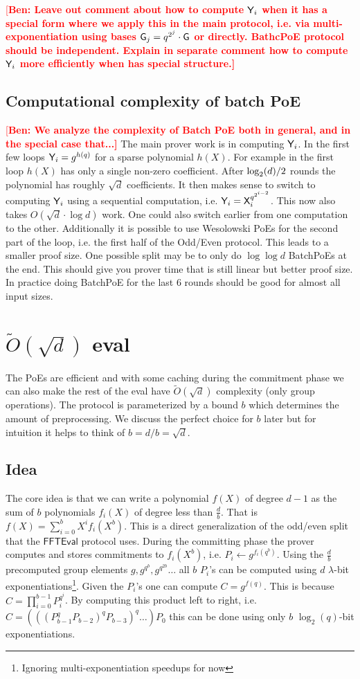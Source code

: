 \documentclass[12pt]{article}
\theoremstyle{Definition}
\newcommand{\ben}[1]{{\textcolor{red}{[\bf Ben: #1]}}}
\newcommand{\ben}[1]{}
\begin{document}
\ben{Leave out comment about how to compute $\mathsf{Y}_i$ when it has a special form where we apply this in the main protocol, i.e. via multi-exponentiation using bases $\mathsf{G}_j=q^{ 2^{j}} \cdot \mathsf{G}$ or directly. BathcPoE protocol should be independent. Explain in separate comment how to compute $\mathsf{Y}_i$ more efficiently when has special structure.}

\subsection{Computational complexity of batch PoE}
\ben{We analyze the complexity of Batch PoE both in general, and in the special case that...} The main prover work is in computing $\mathsf{Y}_i$. In the first few loops $\mathsf{Y}_i=g^{h(q)}$ for a sparse polynomial $h(X)$. For example in the first loop $h(X)$ has only a single non-zero coefficient.
After $\log_2(d)/2$ rounds the polynomial has roughly $\sqrt{d}$ coefficients. It then makes sense to switch to computing $\mathsf{Y}_i$ using a sequential computation, i.e. $\mathsf{Y}_i=\mathsf{X}_i^{q^{2^{i-2}}}$. This now also takes $O(\sqrt{d}\cdot \log{d})$ work. One could also switch earlier from one computation to the other. Additionally it is possible to use Wesolowski PoEs for the second part of the loop, i.e. the first half of the Odd/Even protocol. This leads to a smaller proof size. One possible split may be to only do $\log{\log{d}}$ BatchPoEs at the end. This should give you prover time that is still linear but better proof size. In practice doing BatchPoE for the last $6$ rounds should be good for almost all input sizes.
\section{$\tilde{O}(\sqrt{d})$ eval}
The PoEs are efficient and with some caching during the commitment phase we can also make the rest of the eval have $\tilde{O}(\sqrt{d})$ complexity (only group operations). The protocol is parameterized by a bound $b$ which determines the amount of preprocessing. We discuss the perfect choice for $b$ later but for intuition it helps to think of $b=d/b=\sqrt{d}$.
\subsection{Idea}
The core idea is that we can write a polynomial $f(X)$ of degree $d-1$ as the sum of $b$ polynomials $f_i(X)$ of degree less than $\frac{d}{b}$. That is $f(X)=\sum_{i=0}^b X^i f_i(X^b)$. This is a direct generalization of the odd/even split that the $\textsf{FFTEval}$ protocol uses. During the committing phase the prover computes and stores commitments to $f_i(X^b)$, i.e. $P_i\gets g^{f_i(q^b)}$. Using the $\frac{d}{b}$ precomputed group elements $g,g^{q^b},g^{q^{2b}}\dots$ all $b$ $P_i$'s can be computed using $d$ $\lambda$-bit exponentiations\footnote{Ignoring multi-exponentiation speedups for now}. Given the $P_i$'s one can compute $C=g^{f(q)}$. This is because $C=\prod_{i=0}^{b-1} P_i^{q^i}$. By computing this product left to right, i.e. $C=(((P_{b-1}^qP_{b-2})^qP_{b-3})^q \dots)P_0$ this can be done using only $b$ $\log_2(q)$-bit exponentiations.
\end{document}
